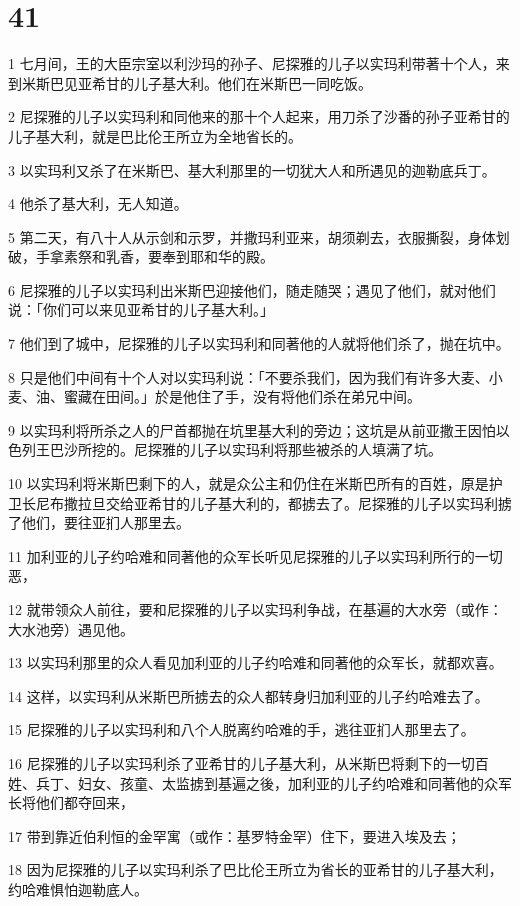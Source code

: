 \chapter{41}

\par 1 七月间，王的大臣宗室以利沙玛的孙子、尼探雅的儿子以实玛利带著十个人，来到米斯巴见亚希甘的儿子基大利。他们在米斯巴一同吃饭。
\par 2 尼探雅的儿子以实玛利和同他来的那十个人起来，用刀杀了沙番的孙子亚希甘的儿子基大利，就是巴比伦王所立为全地省长的。
\par 3 以实玛利又杀了在米斯巴、基大利那里的一切犹大人和所遇见的迦勒底兵丁。
\par 4 他杀了基大利，无人知道。
\par 5 第二天，有八十人从示剑和示罗，并撒玛利亚来，胡须剃去，衣服撕裂，身体划破，手拿素祭和乳香，要奉到耶和华的殿。
\par 6 尼探雅的儿子以实玛利出米斯巴迎接他们，随走随哭；遇见了他们，就对他们说：「你们可以来见亚希甘的儿子基大利。」
\par 7 他们到了城中，尼探雅的儿子以实玛利和同著他的人就将他们杀了，抛在坑中。
\par 8 只是他们中间有十个人对以实玛利说：「不要杀我们，因为我们有许多大麦、小麦、油、蜜藏在田间。」於是他住了手，没有将他们杀在弟兄中间。
\par 9 以实玛利将所杀之人的尸首都抛在坑里基大利的旁边；这坑是从前亚撒王因怕以色列王巴沙所挖的。尼探雅的儿子以实玛利将那些被杀的人填满了坑。
\par 10 以实玛利将米斯巴剩下的人，就是众公主和仍住在米斯巴所有的百姓，原是护卫长尼布撒拉旦交给亚希甘的儿子基大利的，都掳去了。尼探雅的儿子以实玛利掳了他们，要往亚扪人那里去。
\par 11 加利亚的儿子约哈难和同著他的众军长听见尼探雅的儿子以实玛利所行的一切恶，
\par 12 就带领众人前往，要和尼探雅的儿子以实玛利争战，在基遍的大水旁（或作：大水池旁）遇见他。
\par 13 以实玛利那里的众人看见加利亚的儿子约哈难和同著他的众军长，就都欢喜。
\par 14 这样，以实玛利从米斯巴所掳去的众人都转身归加利亚的儿子约哈难去了。
\par 15 尼探雅的儿子以实玛利和八个人脱离约哈难的手，逃往亚扪人那里去了。
\par 16 尼探雅的儿子以实玛利杀了亚希甘的儿子基大利，从米斯巴将剩下的一切百姓、兵丁、妇女、孩童、太监掳到基遍之後，加利亚的儿子约哈难和同著他的众军长将他们都夺回来，
\par 17 带到靠近伯利恒的金罕寓（或作：基罗特金罕）住下，要进入埃及去；
\par 18 因为尼探雅的儿子以实玛利杀了巴比伦王所立为省长的亚希甘的儿子基大利，约哈难惧怕迦勒底人。

